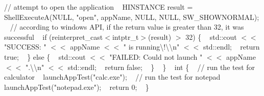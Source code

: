 /\+/\+ attempt to open the application ~\newline
 HINSTANCE result = Shell\+ExecuteA(NULL, "{}open"{}, app\+Name, NULL, NULL, SW\+\_\+\+SHOWNORMAL); ~\newline
 /\+/\+ according to windows API, if the return value is greater than 32, it was successful ~\newline
 if (reinterpret\+\_\+cast\texorpdfstring{$<$}{<}intptr\+\_\+t\texorpdfstring{$>$}{>}(result) \texorpdfstring{$>$}{>} 32) \{ ~\newline
 std::\+cout \texorpdfstring{$<$}{<}\texorpdfstring{$<$}{<} "{}\+SUCCESS:\+ "{} \texorpdfstring{$<$}{<}\texorpdfstring{$<$}{<} app\+Name \texorpdfstring{$<$}{<}\texorpdfstring{$<$}{<} "{} is running\textbackslash{}!\textbackslash{}\textbackslash{}n"{} \texorpdfstring{$<$}{<}\texorpdfstring{$<$}{<} std::\+endl; ~\newline
 return true; ~\newline
 \} else \{ ~\newline
 std::\+cout \texorpdfstring{$<$}{<}\texorpdfstring{$<$}{<} "{}\+FAILED:\+ Could not launch "{} \texorpdfstring{$<$}{<}\texorpdfstring{$<$}{<} app\+Name \texorpdfstring{$<$}{<}\texorpdfstring{$<$}{<} "{}.\textbackslash{}\textbackslash{}n"{} \texorpdfstring{$<$}{<}\texorpdfstring{$<$}{<} std::\+endl; ~\newline
 return false; ~\newline
 \} ~\newline
 \} ~\newline
 int  \{ ~\newline
 /\+/\+ run the test for calculator ~\newline
 launch\+App\+Test("{}calc.\+exe"{}); ~\newline
 /\+/\+ run the test for notepad ~\newline
 launch\+App\+Test("{}notepad.\+exe"{}); ~\newline
 return 0; ~\newline
 \} 
